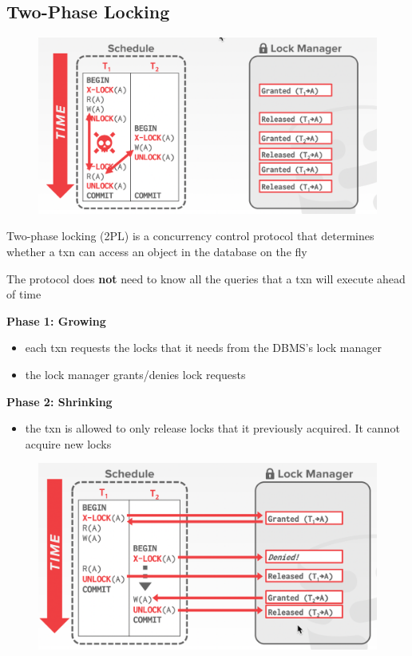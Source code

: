 \documentclass[11pt]{article}
\begin{document}
\subsection{Two-Phase Locking}
\label{sec:orgb846404}
\begin{figure}[htbp]
\centering
\includegraphics[width=.7\textwidth]{../images/15445/57.png}
\label{}
\end{figure}
Two-phase locking (2PL) is a concurrency control protocol that determines whether a txn can
access an object in the database on the fly

The protocol does \textbf{not} need to know all the queries that a txn will execute ahead of time

\textbf{Phase 1: Growing}
\begin{itemize}
\item each txn requests the locks that it needs from the DBMS's lock manager
\item the lock manager grants/denies lock requests
\end{itemize}

\textbf{Phase 2: Shrinking}
\begin{itemize}
\item the txn is allowed to only release locks that it previously acquired. It cannot acquire new
locks
\end{itemize}

\begin{figure}[htbp]
\centering
\includegraphics[width=.7\textwidth]{../images/15445/58.png}
\label{}
\end{figure}
\end{document}
